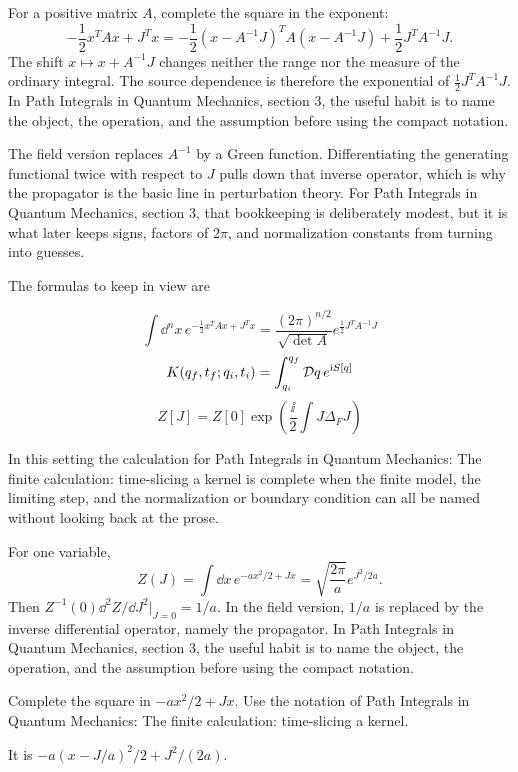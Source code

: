 For a positive matrix \(A\), complete the square in the exponent:
\[
  -\frac12x^TAx+J^Tx
  =
  -\frac12(x-A^{-1}J)^TA(x-A^{-1}J)
  +\frac12J^TA^{-1}J.
\]
The shift \(x\mapsto x+A^{-1}J\) changes neither the range nor the measure of the ordinary integral.  The source dependence is therefore the exponential of \(\frac12J^TA^{-1}J\).  In Path Integrals in Quantum Mechanics, section 3, the useful habit is to name the object, the operation, and the assumption before using the compact notation.

The field version replaces \(A^{-1}\) by a Green function.  Differentiating the generating functional twice with respect to \(J\) pulls down that inverse operator, which is why the propagator is the basic line in perturbation theory.  For Path Integrals in Quantum Mechanics, section 3, that bookkeeping is deliberately modest, but it is what later keeps signs, factors of \(2\pi\), and normalization constants from turning into guesses.

The formulas to keep in view are

\[
  \int\dd^n x\,e^{-\frac12x^TAx+J^Tx}=\frac{(2\pi)^{n/2}}{\sqrt{\det A}}e^{\frac12J^TA^{-1}J}
\]
\[
  K(q_f,t_f;q_i,t_i)=\int_{q_i}^{q_f}\mathcal D q\,e^{\mathrm i S[q]}
\]
\[
  Z[J]=Z[0]\exp\left(\frac{\ii}{2}\int J\Delta_FJ\right)
\]

In this setting the calculation for Path Integrals in Quantum Mechanics: The finite calculation: time-slicing a kernel is complete when the finite model, the limiting step, and the normalization or boundary condition can all be named without looking back at the prose.




\begin{example}
For one variable,
\[
  Z(J)=\int\dd x\,e^{-ax^2/2+Jx}
  =\sqrt{\frac{2\pi}{a}}e^{J^2/2a}.
\]
Then \(Z^{-1}(0)\dd^2Z/\dd J^2|_{J=0}=1/a\).  In the field version, \(1/a\) is replaced by the inverse differential operator, namely the propagator.  In Path Integrals in Quantum Mechanics, section 3, the useful habit is to name the object, the operation, and the assumption before using the compact notation.
\end{example}



\begin{exercise}
Complete the square in \(-ax^2/2+Jx\).  Use the notation of Path Integrals in Quantum Mechanics: The finite calculation: time-slicing a kernel.
\begin{answer}
It is \(-a(x-J/a)^2/2+J^2/(2a)\).
\end{answer}
\end{exercise}

